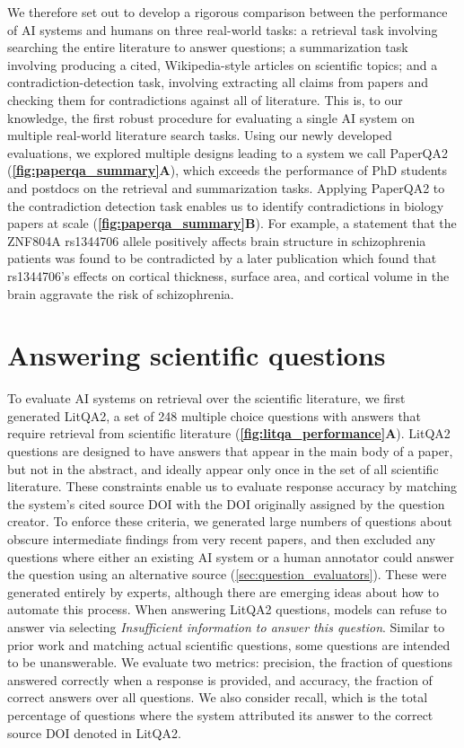 \documentclass{article}
\begin{document}
\begin{bibunit}[unsrt]
We therefore set out to develop a rigorous comparison between the performance of AI systems and humans on three real-world tasks: a retrieval task involving searching the entire literature to answer questions; a summarization task involving producing a cited, Wikipedia-style articles on scientific topics; and a contradiction-detection task, involving extracting all claims from papers and checking them for contradictions against all of literature. This is, to our knowledge, the first robust procedure for evaluating a single AI system on multiple real-world literature search tasks. Using our newly developed evaluations, we explored multiple designs leading to a system we call PaperQA2 (\textbf{\autoref{fig:paperqa_summary}A}), which exceeds the performance of PhD students and postdocs on the retrieval and summarization tasks. Applying PaperQA2 to the contradiction detection task enables us to identify contradictions in biology papers at scale (\textbf{\autoref{fig:paperqa_summary}B}). For example, a statement that the ZNF804A rs1344706 allele positively affects brain structure in schizophrenia patients \cite{wang2019pleiotropic} was found to be contradicted by a later publication which found that rs1344706's effects on cortical thickness, surface area, and cortical volume in the brain aggravate the risk of schizophrenia\cite{wei2015znf804a}.


\section{Answering scientific questions}

To evaluate AI systems on retrieval over the scientific literature, we first generated LitQA2,\cite{laurent2024lab} a set of 248 multiple choice questions with answers that require retrieval from scientific literature (\textbf{\autoref{fig:litqa_performance}A}). LitQA2 questions are designed to have answers that appear in the main body of a paper, but not in the abstract, and ideally appear only once in the set of all scientific literature. These constraints enable us to evaluate response accuracy by matching the system's cited source DOI with the DOI originally assigned by the question creator. To enforce these criteria, we generated large numbers of questions about obscure intermediate findings from very recent papers, and then excluded any questions where either an existing AI system or a human annotator could answer the question using an alternative source (\autoref{sec:question_evaluators}). These were generated entirely by experts, although there are emerging ideas about how to automate this process\cite{wan2024sciqag}. When answering LitQA2 questions, models can refuse to answer via selecting \textit{Insufficient information to answer this question}. Similar to prior work \cite{rajpurkar2018know} and matching actual scientific questions, some questions are intended to be unanswerable. We evaluate two metrics: precision, the fraction of questions answered correctly when a response is provided, and accuracy, the fraction of correct answers over all questions. We also consider recall, which is the total percentage of questions where the system attributed its answer to the correct source DOI denoted in LitQA2.


\end{bibunit}
\end{document}
